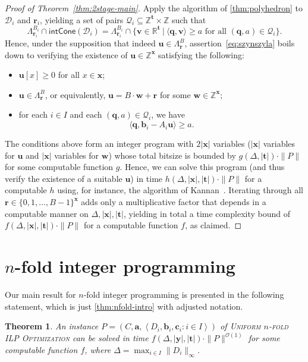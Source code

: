 \documentclass{article}
\newtheorem{theorem}{Theorem}\newtheorem{lemma}[theorem]{Lemma}\newtheorem{proposition}[theorem]{Proposition}\newtheorem{corollary}[theorem]{Corollary}\newtheorem{definition}[theorem]{Definition}\newtheorem{claim}[theorem]{Claim}\newtheorem{remark}[theorem]{Remark}\newtheorem{observation}[theorem]{Observation}\newtheorem{conjecture}[theorem]{Conjecture}\newtheorem{example}[theorem]{Example}
\renewcommand{\geq}{\geqslant}
\newcommand{\Dd}{\mathcal{D}}
\newcommand{\Z}{\mathbb{Z}}
\newcommand{\R}{\mathbb{R}}
\newcommand{\tup}[1]{{\mathbf{#1}}}
\newcommand{\xx}{\tup x}
\newcommand{\ww}{\tup w}
\newcommand{\yy}{\tup y}
\newcommand{\tv}{\tup t}
\newcommand{\av}{\tup a}
\newcommand{\bb}{\tup b}
\newcommand{\cc}{\tup c}
\newcommand{\rr}{\tup r}
\newcommand{\qq}{\tup q}
\newcommand{\uu}{\tup u}
\newcommand{\myvv}{\tup v} %
\newcommand{\mset}[1]{\left\langle #1\right\rangle}
\newcommand{\Oh}{{\mathcal{O}}}
\newcommand{\Qq}{\mathcal{Q}}
\newcommand{\sca}[2]{\langle #1,#2\rangle}
\newcommand{\nfoldOpt}{\textsc{$n$-fold ILP Optimization}}
\newcommand{\nfold}{$n$-fold}
\newcommand{\intcone}{\mathsf{intCone}}
\begin{document}
\begin{proof}[Proof of Theorem~\ref{thm:2stage-main}]
 Apply the algorithm of \cref{thm:polyhedron} to $\Dd_i$ and $\rr_i$, yielding a set of pairs $\Qq_i\subseteq \Z^\tv\times \Z$ such that
 $$\Lambda^{B_i}_{\rr_i}\cap \intcone(\Dd_i) = \Lambda^{B_i}_{\rr_i}\cap \{\myvv\in \R^\tv~|~\sca{\qq}{\myvv}\geq a\textrm{ for all }(\qq,a)\in \Qq_i\}.$$
 Hence, under the supposition that indeed $\uu\in \Lambda_\rr^B$, assertion~\cref{eq:szynszyla} boils down to verifying the existence of $\uu\in \Z^{\xx}$ satisfying the following:
 \begin{itemize}[nosep]
  \item $\uu[x]\geq 0$ for all $x\in \xx$;
  \item $\uu\in \Lambda_\rr^B$, or equivalently, $\uu=B\cdot \ww+\rr$ for some $\ww\in \Z^\xx$;
  \item for each $i\in I$ and each $(\qq,a)\in \Qq_i$, we have
  $$\sca{\qq}{\bb_i-A_i\uu}\geq a.$$
 \end{itemize}
 The conditions above form an integer program with $2|\xx|$ variables ($|\xx|$ variables for $\uu$ and $|\xx|$ variables for $\ww$) whose total bitsize is bounded by $g(\Delta,|\tv|)\cdot \|P\|$ for some computable function $g$. Hence, we can solve this program (and thus verify the existence of a suitable $\uu$) in time $h(\Delta,|\xx|,|\tv|)\cdot \|P\|$ for a computable $h$ using, for instance, the algorithm of Kannan~\cite{kannan1987minkowski}. Iterating through all $\rr\in \{0,1,\ldots,B-1\}^\xx$ adds only a multiplicative factor that depends in a computable manner on $\Delta,|\xx|,|\tv|$, yielding in total a time complexity bound of $f(\Delta,|\xx|,|\tv|)\cdot \|P\|$ for a computable function $f$, as claimed.
\end{proof}

\section{\texorpdfstring{\nfold{}}{n-fold} integer programming}

Our main result for \nfold{} integer programming is presented in the following statement, which is just \cref{thm:nfold-intro} with adjusted notation.

\begin{theorem}\label{thm:nfold-main}
An instance $P=(C,\av,\mset{D_i,\bb_i,\cc_i\colon i\in I})$ of {\textsc{Uniform}} \nfoldOpt{} can be solved in time $f(\Delta,|\yy|,|\tv|)\cdot \|P\|^{\Oh(1)}$ for some computable function $f$, where $\Delta=\max_{i\in I}\|D_i\|_\infty$.
\end{theorem}
\end{document}
